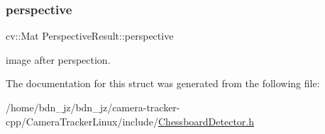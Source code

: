 \subsubsection{\texorpdfstring{perspective}{perspective}}
{\footnotesize\ttfamily cv\+::\+Mat Perspective\+Result\+::perspective}

image after perspection. 

The documentation for this struct was generated from the following file\+:\begin{DoxyCompactItemize}
\item 
/home/bdn\+\_\+jz/bdn\+\_\+jz/camera-\/tracker-\/cpp/\+Camera\+Tracker\+Linux/include/\hyperlink{_chessboard_detector_8h}{Chessboard\+Detector.\+h}\end{DoxyCompactItemize}
